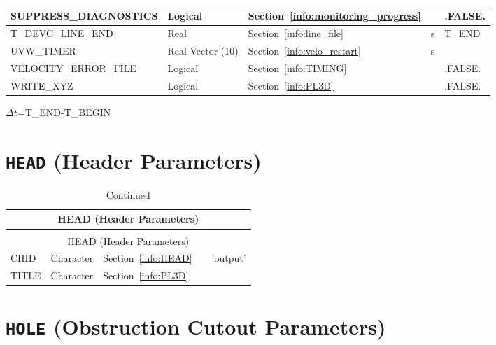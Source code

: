 \documentclass[11pt]{book}
\begin{document}
\begin{longtable}{@{\extracolsep{\fill}}|l|l|l|l|l|}
{\ct SUPPRESS\_DIAGNOSTICS}         & Logical      & Section~\ref{info:monitoring_progress} &           & {\ct .FALSE.}                  \\ \hline
{\ct T\_DEVC\_LINE\_END}            & Real         & Section~\ref{info:line_file}           &  s        & {\ct T\_END}                   \\ \hline
{\ct UVW\_TIMER}                    & Real Vector (10)  & Section~\ref{info:velo_restart}   &  s        &                                \\ \hline
{\ct VELOCITY\_ERROR\_FILE}         & Logical      & Section~\ref{info:TIMING}              &           & {\ct .FALSE.}                  \\ \hline
{\ct WRITE\_XYZ}                    & Logical      & Section~\ref{info:PL3D}                &           & {\ct .FALSE.}                  \\ \hline
\end{longtable}

\noindent
$\Delta t$={\ct T\_END-T\_BEGIN}

\vspace{\baselineskip}

\section{\texorpdfstring{{\tt HEAD}}{HEAD} (Header Parameters)}


\begin{longtable}{@{\extracolsep{\fill}}|l|l|l|l|l|}
\caption[Header parameters ({\ct HEAD} namelist group)]{For more information see Section~\ref{info:HEAD}.}
\label{tbl:HEAD} \\
\hline
\multicolumn{5}{|c|}{{\ct HEAD} (Header Parameters)} \\
\hline \hline
\endfirsthead
\caption[]{Continued} \\
\hline
\multicolumn{5}{|c|}{{\ct HEAD} (Header Parameters)} \\
\hline \hline
\endhead
{\ct CHID}      & Character   & Section~\ref{info:HEAD}     &           & {\ct 'output'}    \\ \hline
{\ct TITLE}     & Character   & Section~\ref{info:PL3D}     &           &                   \\ \hline
\end{longtable}

\vspace{\baselineskip}


\section{\texorpdfstring{{\tt HOLE}}{HOLE} (Obstruction Cutout Parameters)}
\end{document}

